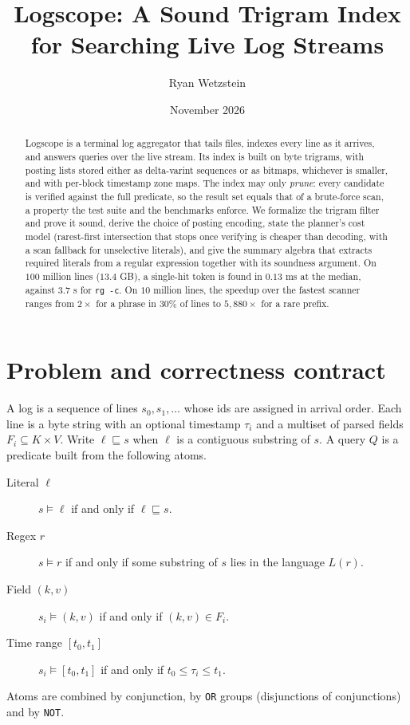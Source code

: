 \documentclass[11pt]{article}
\title{Logscope: A Sound Trigram Index\\for Searching Live Log Streams}
\author{Ryan Wetzstein}
\date{November 2026}
\theoremstyle{plain}
\theoremstyle{definition}
\theoremstyle{remark}
\newcommand{\code}[1]{\texttt{#1}}
\newcommand{\sub}{\sqsubseteq}
\begin{document}
\maketitle

\begin{abstract}
Logscope is a terminal log aggregator that tails files, indexes every line as it
arrives, and answers queries over the live stream. Its index is built on byte
trigrams, with posting lists stored either as delta-varint sequences or as
bitmaps, whichever is smaller, and with per-block timestamp zone maps. The index
may only \emph{prune}: every candidate is verified against the full predicate, so
the result set equals that of a brute-force scan, a property the test suite and
the benchmarks enforce. We formalize the trigram filter and prove it sound,
derive the choice of posting encoding, state the planner's cost model
(rarest-first intersection that stops once verifying is cheaper than decoding,
with a scan fallback for unselective literals), and give the summary algebra
that extracts required literals from a regular expression together with its
soundness argument. On $100$ million lines ($13.4$ GB), a single-hit token is
found in $0.13$ ms at the median, against $3.7$ s for \code{rg -c}. On $10$
million lines, the speedup over the fastest scanner ranges from $2\times$ for a
phrase in $30\%$ of lines to $5{,}880\times$ for a rare prefix.
\end{abstract}

\tableofcontents

\section{Problem and correctness contract}\label{sec:contract}

A log is a sequence of lines $s_0, s_1, \ldots$ whose ids are assigned in
arrival order. Each line is a byte string with an optional timestamp $\tau_i$ and
a multiset of parsed fields $F_i \subseteq K \times V$. Write $\ell \sub s$ when
$\ell$ is a contiguous substring of $s$. A query $Q$ is a predicate built from
the following atoms.
\begin{description}
  \item[Literal $\ell$] $s \models \ell$ if and only if $\ell \sub s$.
  \item[Regex $r$] $s \models r$ if and only if some substring of $s$ lies in
        the language $L(r)$.
  \item[Field $(k, v)$] $s_i \models (k,v)$ if and only if $(k, v) \in F_i$.
  \item[{Time range $[t_0, t_1]$}] $s_i \models [t_0, t_1]$ if and only if
        $t_0 \le \tau_i \le t_1$.
\end{description}
Atoms are combined by conjunction, by \code{OR} groups (disjunctions of
conjunctions) and by \code{NOT}.
\end{document}
